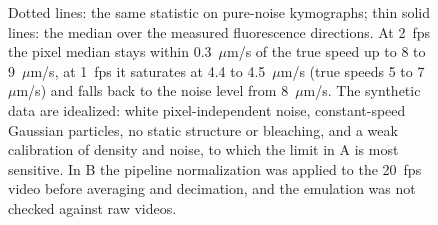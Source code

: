 \begin{figure}[htbp]
{Dotted lines: the same statistic on pure-noise kymographs; thin solid lines: the median over the measured fluorescence directions.
At 2~fps the pixel median stays within 0.3~$\mu$m/s of the true speed up to 8 to 9~$\mu$m/s, at 1~fps it saturates at 4.4 to 4.5~$\mu$m/s (true speeds 5 to 7~$\mu$m/s) and falls back to the noise level from 8~$\mu$m/s.
The synthetic data are idealized: white pixel-independent noise, constant-speed Gaussian particles, no static structure or bleaching, and a weak calibration of density and noise, to which the limit in A is most sensitive.
In B the pipeline normalization was applied to the 20~fps video before averaging and decimation, and the emulation was not checked against raw videos.}\label{fig:fl_detection_limit}
\end{figure}



